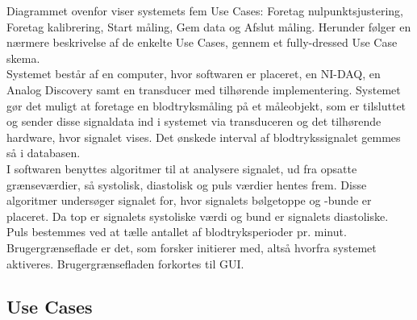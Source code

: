 Diagrammet ovenfor viser systemets fem Use Cases: Foretag nulpunktsjustering, Foretag kalibrering, Start måling, Gem data og Afslut måling. Herunder følger en nærmere beskrivelse af de enkelte Use Cases, gennem et fully-dressed Use Case skema. \\
\newline
Systemet består af en computer, hvor softwaren er placeret, en NI-DAQ, en Analog Discovery samt en transducer med tilhørende implementering. Systemet gør det muligt at foretage en blodtryksmåling på et måleobjekt, som er tilsluttet og sender disse signaldata ind i systemet via transduceren og det tilhørende hardware, hvor signalet vises. Det ønskede interval af blodtrykssignalet gemmes så i databasen. \\
I softwaren benyttes algoritmer til at analysere signalet, ud fra opsatte grænseværdier, så systolisk, diastolisk og puls værdier hentes frem. Disse algoritmer undersøger signalet for, hvor signalets bølgetoppe og -bunde er placeret. Da top er signalets systoliske værdi og bund er signalets diastoliske. Puls bestemmes ved at tælle antallet af blodtryksperioder pr. minut. \\    
Brugergrænseflade er det, som forsker initierer med, altså hvorfra systemet aktiveres. Brugergrænsefladen forkortes til GUI. 

\subsection{Use Cases}

